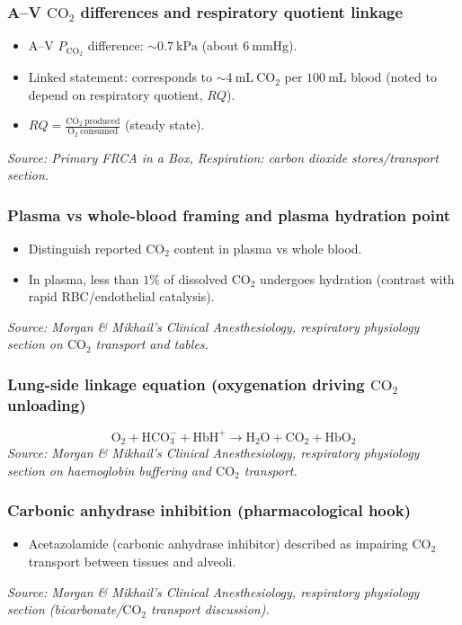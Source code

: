 \documentclass[11pt,a4paper]{article}
\begin{document}
\subsubsection{A--V \(\mathrm{CO_2}\) differences and respiratory quotient linkage}
\begin{itemize}
  \item A--V \(P_{\mathrm{CO_2}}\) difference: \(\sim 0.7~\mathrm{kPa}\) (about \(6~\mathrm{mmHg}\)).
  \item Linked statement: corresponds to \(\sim 4~\mathrm{mL~CO_2}\) per \(100~\mathrm{mL}\) blood (noted to depend on respiratory quotient, \(RQ\)).
  \item \(RQ = \frac{\mathrm{CO_2\ produced}}{\mathrm{O_2\ consumed}}\) (steady state).
\end{itemize}
\textit{Source: Primary FRCA in a Box, Respiration: carbon dioxide stores/transport section.}

\subsubsection{Plasma vs whole-blood framing and plasma hydration point}
\begin{itemize}
  \item Distinguish reported \(\mathrm{CO_2}\) content in plasma vs whole blood.
  \item In plasma, less than \(1\%\) of dissolved \(\mathrm{CO_2}\) undergoes hydration (contrast with rapid RBC/endothelial catalysis).
\end{itemize}
\textit{Source: Morgan \& Mikhail’s Clinical Anesthesiology, respiratory physiology section on \(\mathrm{CO_2}\) transport and tables.}

\subsubsection{Lung-side linkage equation (oxygenation driving \(\mathrm{CO_2}\) unloading)}
\[
  \mathrm{O_2 + HCO_3^- + HbH^+ \rightarrow H_2O + CO_2 + HbO_2}
\]
\textit{Source: Morgan \& Mikhail’s Clinical Anesthesiology, respiratory physiology section on haemoglobin buffering and \(\mathrm{CO_2}\) transport.}

\subsubsection{Carbonic anhydrase inhibition (pharmacological hook)}
\begin{itemize}
  \item Acetazolamide (carbonic anhydrase inhibitor) described as impairing \(\mathrm{CO_2}\) transport between tissues and alveoli.
\end{itemize}
\textit{Source: Morgan \& Mikhail’s Clinical Anesthesiology, respiratory physiology section (bicarbonate/\(\mathrm{CO_2}\) transport discussion).}
\end{document}
